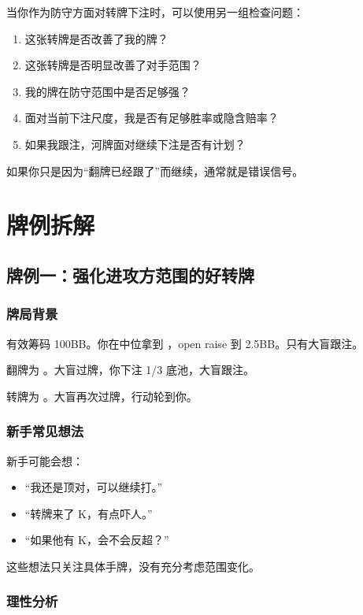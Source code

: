 当你作为防守方面对转牌下注时，可以使用另一组检查问题：

\begin{enumerate}
\item 这张转牌是否改善了我的牌？
\item 这张转牌是否明显改善了对手范围？
\item 我的牌在防守范围中是否足够强？
\item 面对当前下注尺度，我是否有足够胜率或隐含赔率？
\item 如果我跟注，河牌面对继续下注是否有计划？
\end{enumerate}

如果你只是因为“翻牌已经跟了”而继续，通常就是错误信号。

\section{牌例拆解}

\subsection{牌例一：强化进攻方范围的好转牌}

\subsubsection*{牌局背景}

有效筹码 100BB。你在中位拿到 ，open raise 到 2.5BB。只有大盲跟注。

翻牌为 。大盲过牌，你下注 1/3 底池，大盲跟注。

转牌为 。大盲再次过牌，行动轮到你。

\subsubsection*{新手常见想法}

新手可能会想：

\begin{itemize}
\item “我还是顶对，可以继续打。”
\item “转牌来了 K，有点吓人。”
\item “如果他有 K，会不会反超？”
\end{itemize}

这些想法只关注具体手牌，没有充分考虑范围变化。

\subsubsection*{理性分析}

